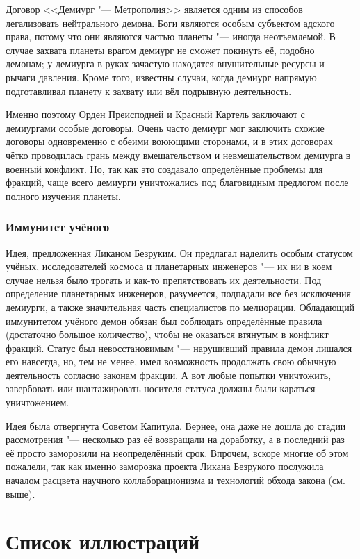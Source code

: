 Договор <<Демиург "--- Метрополия>> является одним из способов легализовать нейтрального демона.
Боги являются особым субъектом адского права, потому что они являются частью планеты "--- иногда неотъемлемой.
В случае захвата планеты врагом демиург не сможет покинуть её, подобно демонам;
у демиурга в руках зачастую находятся внушительные ресурсы и рычаги давления.
Кроме того, известны случаи, когда демиург напрямую подготавливал планету к захвату или вёл подрывную деятельность.

Именно поэтому Орден Преисподней и Красный Картель заключают с демиургами особые договоры.
Очень часто демиург мог заключить схожие договоры одновременно с обеими воюющими сторонами, и в этих договорах чётко проводилась грань между вмешательством и невмешательством демиурга в военный конфликт.
Но, так как это создавало определённые проблемы для фракций, чаще всего демиурги уничтожались под благовидным предлогом после полного изучения планеты.

\subsubsection{Иммунитет учёного}

Идея, предложенная Ликаном Безруким.
Он предлагал наделить особым статусом учёных, исследователей космоса и планетарных инженеров "--- их ни в коем случае нельзя было трогать и как-то препятствовать их деятельности.
Под определение планетарных инженеров, разумеется, подпадали все без исключения демиурги, а также значительная часть специалистов по мелиорации.
Обладающий иммунитетом учёного демон обязан был соблюдать определённые правила (достаточно большое количество), чтобы не оказаться втянутым в конфликт фракций.
Статус был невосстановимым "--- нарушивший правила демон лишался его навсегда, но, тем не менее, имел возможность продолжать свою обычную деятельность согласно законам фракции.
А вот любые попытки уничтожить, завербовать или шантажировать носителя статуса должны были караться уничтожением.

Идея была отвергнута Советом Капитула.
Вернее, она даже не дошла до стадии рассмотрения "--- несколько раз её возвращали на доработку, а в последний раз её просто заморозили на неопределённый срок.
Впрочем, вскоре многие об этом пожалели, так как именно заморозка проекта Ликана Безрукого послужила началом расцвета научного коллаборационизма и технологий обхода закона (см. выше).

\section{Список иллюстраций}

